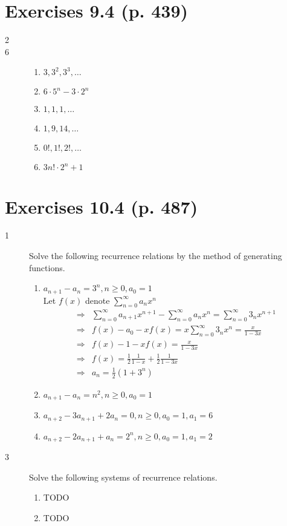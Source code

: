 \documentclass[a4paper]{article}
\begin{document}
\section*{Exercises 9.4 (p. 439)  }
\begin{description}
\item[2]
\item[6]
\begin{enumerate}[label=(\alph*)]
    \item $3,3^2,3^3,\ldots$
    \item $6\cdot 5^n - 3\cdot 2^n$
    \item $1, 1, 1,\ldots$
    \item $1,9,14,\ldots$
    \item $0!, 1!, 2!, \ldots$
    \item $3n!\cdot 2^n + 1$
\end{enumerate}
\end{description}


\section*{Exercises 10.4 (p. 487) }
\begin{description}
\item[1] Solve the following recurrence relations by the method of generating functions.
\begin{enumerate}[label=\alph*)]
    \item $a_{n+1}-a_n=3^n,n\geq 0, a_0=1$\\
    Let $f(x)$ denote $\sum_{n=0}^{\infty}{a_nx^n}$
    \begin{align*}
    \Rightarrow&\sum_{n=0}^{\infty}{a_{n+1}x^{n+1}} - \sum_{n=0}^{\infty}{a_nx^n} = \sum_{n=0}^{\infty}{3_nx^{n+1}}\\
    \Rightarrow& f(x)-a_0-xf(x)=x\sum_{n=0}^{\infty}{3_nx^{n}}=\frac{x}{1-3x}\\
    \Rightarrow& f(x)-1-xf(x)=\frac{x}{1-3x}\\
    \Rightarrow&f(x)=\frac{1}{2}\frac{1}{1-x}+\frac{1}{2}\frac{1}{1-3x}\\
    \Rightarrow&a_n=\frac{1}{2}(1+3^n)
    \end{align*}
    \item $a_{n+1}-a_n=n^2,n\geq 0,a_0=1$
    \item $a_{n+2}-3a_{n+1}+2a_n=0,n\geq 0,a_0=1,a_1=6$
    \item $a_{n+2}-2a_{n+1}+a_n=2^n,n\geq 0,a_0=1,a_1=2$
\end{enumerate}

\item[3] Solve the following systems of recurrence relations.
\begin{enumerate}[label=\alph*)]
    \item TODO
    \item TODO
\end{enumerate}
\end{description}
\end{document}

